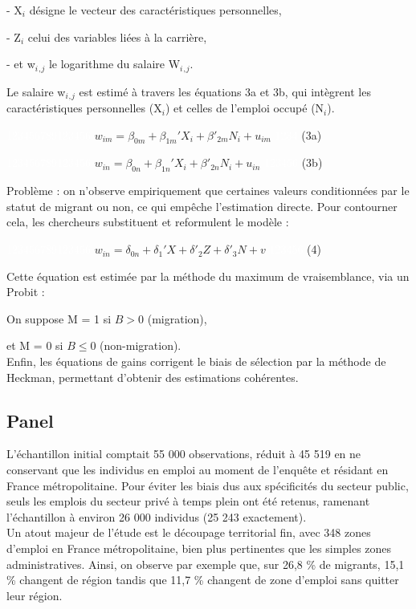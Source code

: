 \documentclass{article}
\begin{document}
\vspace{5pt}

 - X$_i$ désigne le vecteur des caractéristiques personnelles,

 - Z$_i$ celui des variables liées à la carrière,

 - et w$_i$$_,$$_j$ le logarithme du salaire W$_i$$_,$$_j$.

\vspace{5pt}
 
Le salaire w$_i$$_,$$_j$ est estimé à travers les équations 3a et 3b, qui intègrent les caractéristiques personnelles (X$_i$) et celles de l’emploi occupé (N$_i$).

\vspace{5pt}

\textcolor{white}{123456789123456} $w_{im} = \beta_{0m} + \beta_{1m}'X_i + \beta'_{2m}N_i + u_{im} $ \textcolor{white}{1234}   (3a)

\textcolor{white}{123456789123456} $w_{in} = \beta_{0n} + \beta_{1n}'X_i + \beta'_{2n}N_i + u_{in} $ \textcolor{white}{123456}   (3b)

\vspace{5pt}

Problème : on n’observe empiriquement que certaines valeurs conditionnées par le statut de migrant ou non, ce qui empêche l’estimation directe. Pour contourner cela, les chercheurs substituent et reformulent le modèle :

\vspace{5pt}

\textcolor{white}{123456789123456} $w_{in} = \delta_{0n} + \delta_{1}'X + \delta'_{2}Z + \delta'_{3}N + v $ \textcolor{white}{123456}   (4)

\vspace{5pt}

Cette équation est estimée par la méthode du maximum de vraisemblance, via un Probit :

On suppose M = 1 si $B > 0$ (migration),

et M = 0 si $B\leq 0$ (non-migration).\\
Enfin, les équations de gains corrigent le biais de sélection par la méthode de Heckman, permettant d’obtenir des estimations cohérentes.

\subsection{Panel}

L’échantillon initial comptait 55 000 observations, réduit à 45 519 en ne conservant que les individus en emploi au moment de l’enquête et résidant en France métropolitaine. Pour éviter les biais dus aux spécificités du secteur public, seuls les emplois du secteur privé à temps plein ont été retenus, ramenant l’échantillon à environ 26 000 individus (25 243 exactement).\\
Un atout majeur de l’étude est le découpage territorial fin, avec 348 zones d’emploi en France métropolitaine, bien plus pertinentes que les simples zones administratives. Ainsi, on observe par exemple que, sur 26,8 \% de migrants, 15,1 \% changent de région tandis que 11,7 \% changent de zone d’emploi sans quitter leur région.
\end{document}
